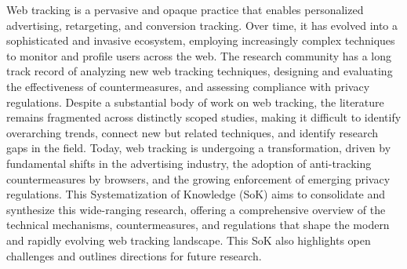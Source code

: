 Web tracking is a pervasive and opaque practice that enables personalized advertising, retargeting, and conversion tracking.
%
Over time, it has evolved into a sophisticated and invasive ecosystem, employing increasingly complex techniques to monitor and profile users across the web.
%
The research community has a long track record of analyzing new web tracking techniques, designing and evaluating the effectiveness of countermeasures, and assessing compliance with privacy regulations.
%
Despite a substantial body of work on web tracking, the literature remains fragmented across distinctly scoped studies, making it difficult to identify overarching trends, connect new but related techniques, and identify research gaps in the field.
%
Today, web tracking is undergoing a transformation, driven by fundamental shifts in the advertising industry, the adoption of anti-tracking countermeasures by browsers, and the growing enforcement of emerging privacy regulations.
%
This Systematization of Knowledge (SoK) aims to consolidate and synthesize this wide-ranging research, offering a comprehensive overview of the technical mechanisms, countermeasures, and regulations that shape the modern and rapidly evolving web tracking landscape.
%
This SoK also highlights open challenges and outlines directions for future research.